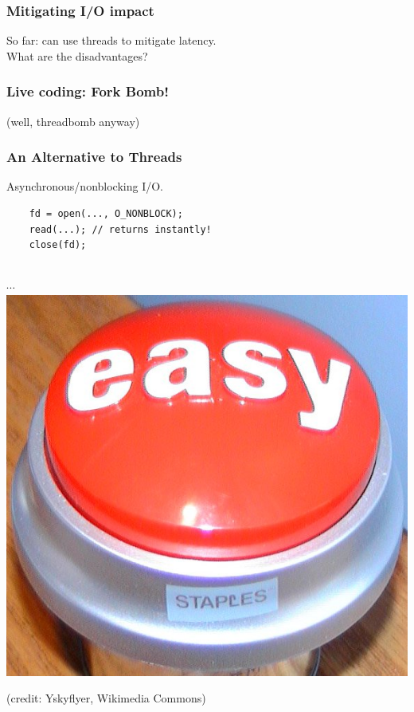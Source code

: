\begin{frame}[fragile]
  \frametitle{Mitigating I/O impact}

    So far: can use threads to mitigate latency.\\

    What are the disadvantages?

\end{frame}

\begin{frame}
  \frametitle{Live coding: Fork Bomb! }

\begin{center}
(well, threadbomb anyway)
\end{center}

\end{frame}

\begin{frame}[fragile]
  \frametitle{An Alternative to Threads}

    Asynchronous/nonblocking I/O.\\[2em]


\begin{minipage}{.6\textwidth}
\begin{lstlisting}
    fd = open(..., O_NONBLOCK);
    read(...); // returns instantly!
    close(fd);
  \end{lstlisting}
\end{minipage}


\begin{center}
~\\[1em]
$\cdots$\\[2em]

\includegraphics[width=.25\textwidth]{images/Easy_button.JPG}
\end{center}
\hfill {\scriptsize (credit: Yskyflyer, Wikimedia Commons)}


\end{frame}

